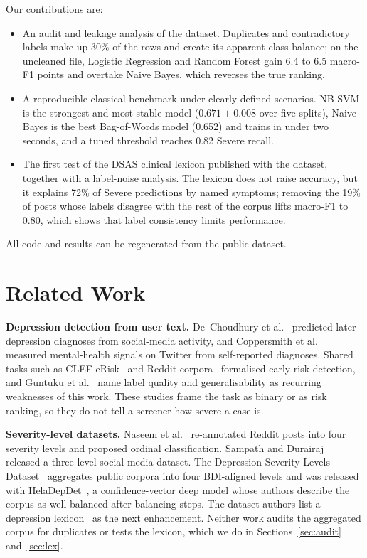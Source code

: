 \documentclass[conference]{IEEEtran}
\begin{document}
Our contributions are:
\begin{itemize}
  \item An audit and leakage analysis of the dataset. Duplicates and contradictory labels make up 30\% of the rows and create its apparent class balance; on the uncleaned file, Logistic Regression and Random Forest gain 6.4 to 6.5 macro-F1 points and overtake Naive Bayes, which reverses the true ranking.
  \item A reproducible classical benchmark under clearly defined scenarios. NB-SVM is the strongest and most stable model ($0.671\pm0.008$ over five splits), Naive Bayes is the best Bag-of-Words model (0.652) and trains in under two seconds, and a tuned threshold reaches 0.82 Severe recall.
  \item The first test of the DSAS clinical lexicon published with the dataset, together with a label-noise analysis. The lexicon does not raise accuracy, but it explains 72\% of Severe predictions by named symptoms; removing the 19\% of posts whose labels disagree with the rest of the corpus lifts macro-F1 to 0.80, which shows that label consistency limits performance.
\end{itemize}
All code and results can be regenerated from the public dataset.

\section{Related Work}

\textbf{Depression detection from user text.} De~Choudhury et al.~\cite{dechoudhury2013predicting} predicted later depression diagnoses from social-media activity, and Coppersmith et al.~\cite{coppersmith2014quantifying} measured mental-health signals on Twitter from self-reported diagnoses. Shared tasks such as CLEF eRisk~\cite{losada2016test} and Reddit corpora~\cite{yates2017depression} formalised early-risk detection, and Guntuku et al.~\cite{guntuku2017detecting} name label quality and generalisability as recurring weaknesses of this work. These studies frame the task as binary or as risk ranking, so they do not tell a screener how severe a case is.

\textbf{Severity-level datasets.} Naseem et al.~\cite{naseem2022early} re-annotated Reddit posts into four severity levels and proposed ordinal classification. Sampath and Durairaj~\cite{sampath2022dataset} released a three-level social-media dataset. The Depression Severity Levels Dataset~\cite{kuas2023dataset} aggregates public corpora into four BDI-aligned levels and was released with HelaDepDet~\cite{priyadarshana2023heladepdet}, a confidence-vector deep model whose authors describe the corpus as well balanced after balancing steps. The dataset authors list a depression lexicon~\cite{cha2022lexicon} as the next enhancement. Neither work audits the aggregated corpus for duplicates or tests the lexicon, which we do in Sections~\ref{sec:audit} and~\ref{sec:lex}.
\end{document}
